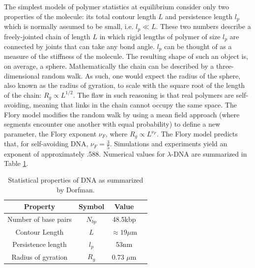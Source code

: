 \documentclass[aps,prl,preprint,groupedaddress]{revtex4}
\begin{document}
The simplest models of polymer statistics at equilibrium consider only two properties of the molecule: its total contour length \(L\) and persistence length $l_p$ which is normally assumed to be small, i.e. \(l_p \ll L\).
These two numbers describe a freely-jointed chain of length \(L\) in which rigid lengths of polymer of size \(l_p\) are connected by joints that can take any bond angle.
\(l_p\) can be thought of as a measure of the stiffness of the molecule.
The resulting shape of such an object is, on average, a sphere.
Mathematically the chain can be described by a three-dimensional random walk.
As such, one would expect the radius of the sphere, also known as the radius of gyration, to scale with the square root of the length of the chain: \(R_g \propto L^{1/2}\).
The flaw in such reasoning is that real polymers are self-avoiding, meaning that links in the chain cannot occupy the same space.
The Flory model modifies the random walk by using a mean field approach (where segments encounter one another with equal probability) to define a new parameter, the Flory exponent \(\nu_F\), where \(R_g \propto L^{\nu_F}\).
The Flory model predicts that, for self-avoiding DNA, \(\nu_F = \frac{3}{5}\).
Simulations and experiments yield an exponent of approximately .588.\cite{exponent}
Numerical values for \(\lambda\)-DNA are summarized in Table \ref{tab:dna-table}.
\begin{table}[H]
\centering
\begin{tabular}{ | c | c | c | c | }
\hline
Property & Symbol & Value \\ \hline
Number of base pairs & \(N_{bp}\) & 48.5kbp \\ \hline
Contour Length & $L$ & $\approx 19 \mu$m \\ \hline
Persistence length & \(l_p\) & 53nm \\ \hline
Radius of gyration & \(R_g\) & 0.73 $\mu$m \\ \hline
\end{tabular}
\caption{Statistical properties of DNA as summarized by Dorfman. \cite{dorfman}}
\label{tab:dna-table}
\end{table}
\end{document}
